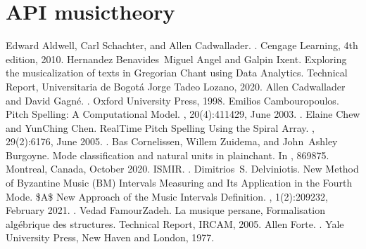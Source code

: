 \documentclass[letterpaper,10pt,english]{sphinxmanual}
\begin{document}
\section{API \sphinxhyphen{} musictheory}
\label{\detokenize{api:api-musictheory}}\label{\detokenize{api::doc}}
\begin{sphinxthebibliography}{10}
Edward Aldwell, Carl Schachter, and Allen Cadwallader. . Cengage Learning, 4th edition, 2010.
Hernandez Benavides Miguel Angel and Galpin Ixent. Exploring the musicalization of texts in Gregorian Chant using Data Analytics. Technical Report, Universitaria de Bogotá Jorge Tadeo Lozano, 2020.
Allen Cadwallader and David Gagné. . Oxford University Press, 1998.
Emilios Cambouropoulos. Pitch Spelling: A Computational Model. , 20(4):411\textendash{}429, June 2003. .
Elaine Chew and Yun\sphinxhyphen{}Ching Chen. Real\sphinxhyphen{}Time Pitch Spelling Using the Spiral Array. , 29(2):61\textendash{}76, June 2005. .
Bas Cornelissen, Willem Zuidema, and John Ashley Burgoyne. Mode classification and natural units in plainchant. In , 869\textendash{}875. Montreal, Canada, October 2020. ISMIR. .
Dimitrios S. Delviniotis. New Method of Byzantine Music (BM) Intervals\textquotesingle{} Measuring and Its Application in the Fourth Mode. \$A\$ New Approach of the Music Intervals\textquotesingle{} Definition. , 1(2):209\textendash{}232, February 2021. .
Vedad FamourZadeh. La musique persane, Formalisation algébrique des structures. Technical Report, IRCAM, 2005.
Allen Forte. . Yale University Press, New Haven and London, 1977.

\end{sphinxthebibliography}
\end{document}
